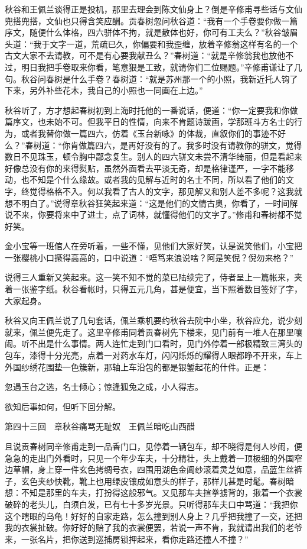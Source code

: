 \documentclass[12pt,UTF8]{ctexbook}
\begin{document}
{{{秋谷和王佩兰谈得正是投机，那里去理会到陈文仙身上？倒是辛修甫寻些话与文仙兜搭兜搭，文仙也只得含笑应酬。贡春树忽问秋谷道：“我有一个手卷要你做一篇序文，随便什么体格，四六骈体不拘，就是散体也好，你可有工夫么？”秋谷皱眉头道：“我于文字一道，荒疏已久，你偏要和我歪缠，放着辛修翁这样有名的一个古文大家不去请教，可不是有心要我献丑么？”春树道：“就是辛修翁我也放他不过，明日我把手卷取来你看，笔意狠是工致，就请你们二位赐题。”辛修甫谦让了几句。秋谷问春树是什么手卷？春树道：“就是苏州那一个的小照，我新近托人钩了下来，另外补些花木，我自己的小照也一同画在上边。”

秋谷听了，方才想起春树初到上海时托他的一番说话，便道：“你一定要我和你做篇序文，也未始不可。但我平日的性情，向来不肯题诗跋画，学那班斗方名士的行为，或者我替你做一篇四六，仿着《玉台新咏》的体裁，直叙你们的事迹不好么？”春树道：“你肯做篇四六，是再好没有的了。我多时没有请教你的骈文，觉得数日不见珠玉，顿令胸中鄙念复生。别人的四六骈文未尝不清华绮丽，但是看起来好像总没有你的来得熨贴，虽然外面看去平淡无奇，却是格律谨严，一字不能移动，也不知是个什么缘故。或者我的见解与近时的名士不同，所以看了他们的文字，终觉得格格不入。何以我看了古人的文字，那见解又和别人差不多呢？这我就想不明白了。”说得章秋谷狂笑起来道：“这是他们的文情古奥，你看了，一时间解说不来，你要将来中了进士，点了词林，就懂得他们的文字了。”修甫和春树都不觉好笑。

金小宝等一班倌人在旁听着，一些不懂，见他们大家好笑，认是说笑他们，小宝把一张樱桃小口撅得高高的，口中说道：“唔笃来浪说啥？阿是笑倪？倪勿来格？”

说得三人重新又笑起来。这一笑不知不觉的菜已陆续完了，侍者呈上一篇帐来，夹着一张鉴字纸。秋谷看帐时，只得五元几角，甚是便宜，当下照着数目签好了字，大家起身。

秋谷又向王佩兰说了几句套话，佩兰乘机要约秋谷去院中小坐，秋谷应允，说少刻就来，佩兰便先走了。这里辛修甫同着贡春树先下楼来，见门前有一堆人在那里嚷闹。听不出是什么事情。两人连忙走到门口看时，见门外停着一部极精致三湾头的包车，漆得十分光亮，点着一对药水车灯，闪闪烁烁的耀得人眼都睁不开来，车上外国纱绣花围垫一色簇新，那轴上车沿包的都是银錾起花的什件。正是：

忽遇玉台之选，名士倾心；惊逢狐兔之成，小人得志。

欲知后事如何，但听下回分解。





第四十三回　章秋谷痛骂无耻奴　王佩兰暗吃山西醋





且说贡春树同辛修甫走到一品香门口，见停着一辆包车，却不晓得是何人吵闹，便急急的走出门外看时，只见一个年少车夫，十分精壮，头上戴着一顶极细的外国窄边草帽，身上穿一件玄色拷绸号衣，四围用湖色金阊纱滚着灵芝如意，品蓝生丝裤子，玄色夹纱快靴，靴上也用绿皮镶成如意头的样子，那样儿甚是时髦。春树暗想：不知是那里的车夫，打扮得这般邪气。又见那车夫揎拳掳背的，揪着一个衣裳破碎的老头儿，白须白发，已有七十多岁光景。只听得那车夫口中骂道：“我把你这个瞎眼的乌龟！好好的自家走路，怎么撞到别人身上？几乎把我撞了一交，还把我的衣裳扯破。你好好的赔了我的衣裳便罢，若说一声不肯，我就请出我们的老爷来，一张名片，把你送到巡捕房锁押起来，看你走路还撞人不撞？”

}}}
\end{document}
